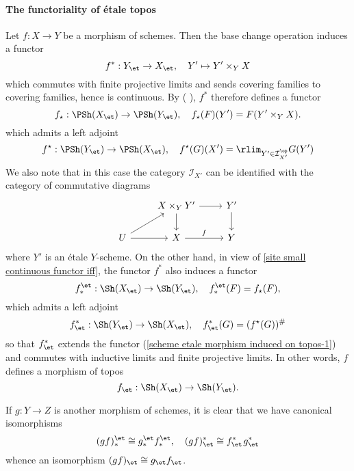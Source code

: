 \paragraph{The functoriality of \'etale topos}
Let $f:X\to Y$ be a morphism of schemes. Then the base change operation induces a functor
\begin{equation}\label{scheme etale morphism induced on topos-1}
f^*:Y_\et\to X_\et,\quad Y'\mapsto Y'\times_YX
\end{equation}
which commutes with finite projective limits and sends covering families to covering families, hence is continuous. By (\cite{SGA4-1} ), $f^*$ therefore defines a functor
\[f_\star:\PSh(X_\et)\to\PSh(Y_\et),\quad f_\star(F)(Y')=F(Y'\times_YX).\]
which admits a left adjoint
\[f^\star:\PSh(Y_\et)\to\PSh(X_\et),\quad f^\star(G)(X')=\rlim_{Y'\in\mathcal{I}_{X'}^{\op}}G(Y')\]
We also note that in this case the category $\mathcal{I}_{X'}$ can be identified with the category of commutative diagrams
\[\begin{tikzcd}
&X\times_YY'\ar[r]\ar[d]&Y'\ar[d]\\
U\ar[ru]\ar[r]&X\ar[r,"f"]&Y
\end{tikzcd}\]
where $Y'$ is an \'etale $Y$-scheme. On the other hand, in view of \cref{site small continuous functor iff}, the functor $f^*$ also induces a functor
\begin{equation}\label{scheme etale morphism induced on topos-2}
f_*^\et:\Sh(X_\et)\to\Sh(Y_\et),\quad f_*^\et(F)=f_\star(F),
\end{equation}
which admits a left adjoint
\begin{equation}\label{scheme etale morphism induced on topos-3}
f^*_\et:\Sh(Y_\et)\to\Sh(X_\et),\quad f^*_\et(G)=(f^\star(G))^\#
\end{equation}
so that $f^*_\et$ extends the functor (\ref{scheme etale morphism induced on topos-1}) and commutes with inductive limits and finite projective limits. In other words, $f$ defines a morphism of topos
\[f_\et:\Sh(X_\et)\to\Sh(Y_\et).\]

If $g:Y\to Z$ is another morphism of schemes, it is clear that we have canonical isomorphisms
\begin{equation}\label{scheme etale site inverse direct image functor transitive-1}
(gf)_*^\et\cong g_*^\et f_*^\et,\quad (gf)^*_\et\cong f_\et^*\hspace{1pt} g^*_\et
\end{equation}
whence an isomorphism $(gf)_\et\cong g_\et f_\et$.

